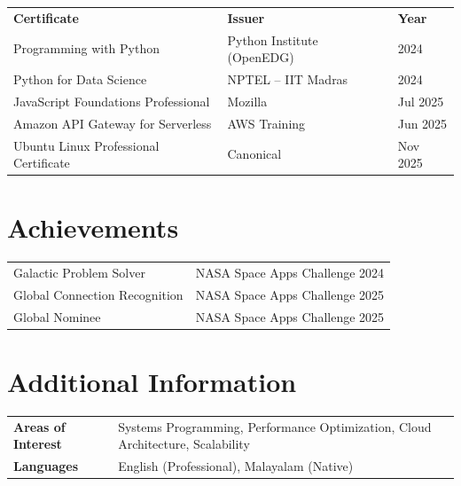 \documentclass[a4paper,10pt]{article}
\begin{document}
\renewcommand{\arraystretch}{1.05}
\begin{tabular}{@{} p{7.8cm} p{6.5cm} p{2.5cm} @{}}
\textbf{Certificate}                  & \textbf{Issuer}              & \textbf{Year} \\[1pt]
Programming with Python               & Python Institute (OpenEDG)   & 2024 \\
Python for Data Science               & NPTEL -- IIT Madras          & 2024 \\
JavaScript Foundations Professional   & Mozilla                      & Jul 2025 \\
Amazon API Gateway for Serverless     & AWS Training                 & Jun 2025 \\
Ubuntu Linux Professional Certificate & Canonical                    & Nov 2025 \\
\end{tabular}

\section*{Achievements}

\begin{tabular}{@{} p{9.5cm} p{8cm} @{}}
Galactic Problem Solver              & NASA Space Apps Challenge 2024 \\
Global Connection Recognition        & NASA Space Apps Challenge 2025 \\
Global Nominee                       & NASA Space Apps Challenge 2025 \\
\end{tabular}

\section*{Additional Information}

\begin{tabular}{@{} >{\bfseries}p{3.8cm} p{13cm} @{}}
Areas of Interest & Systems Programming, Performance Optimization, Cloud Architecture, Scalability \\
Languages         & English (Professional), Malayalam (Native) \\
\end{tabular}

\vspace{3pt}
\end{document}
